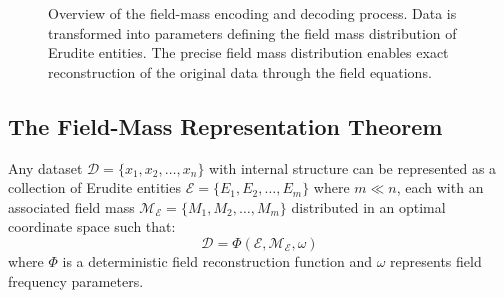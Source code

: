 \begin{figure}[h]
\caption{Overview of the field-mass encoding and decoding process. Data is transformed into parameters defining the field mass distribution of Erudite entities. The precise field mass distribution enables exact reconstruction of the original data through the field equations.}
\label{fig:orbital_encoding}
\end{figure}

\subsection{The Field-Mass Representation Theorem}

\begin{theorem}
Any dataset $\mathcal{D} = \{x_1, x_2, \ldots, x_n\}$ with internal structure can be represented as a collection of Erudite entities $\mathcal{E} = \{E_1, E_2, \ldots, E_m\}$ where $m \ll n$, each with an associated field mass $\mathcal{M}_{\mathcal{E}} = \{M_1, M_2, \ldots, M_m\}$ distributed in an optimal coordinate space such that:
\begin{equation}
\mathcal{D} = \Phi(\mathcal{E}, \mathcal{M}_{\mathcal{E}}, \omega)
\end{equation}
where $\Phi$ is a deterministic field reconstruction function and $\omega$ represents field frequency parameters.
\end{theorem}

